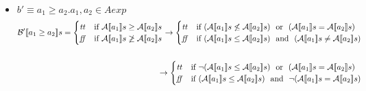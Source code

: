 {\begin{enumerate}[label=(\alph*)]
\begin{itemize}
\begin{align*}
\begin{cases}
        \end{cases}
        \rightarrow
        \begin{cases} 
        \semtrue & 
        \mbox{if} \ (\A{a_1} \leq \A{a_2}) \ \mbox{ and } \ (\A{a_1} \not =  \A{a_2})\\ 
        \semfalse & 
        \mbox{if} \ \lnot ((\A{a_1} \leq \A{a_2}) \ \mbox{ and } \ (\A{a_1} \not =  \A{a_2}))\\
        \end{cases} \\ \\
        \rightarrow
        \begin{cases} 
        \semtrue & 
        \mbox{if} \ (\A{a_1} \leq \A{a_2}) \ \mbox{ and } \ \lnot (\A{a_1} =  \A{a_2})\\ 
        \semfalse & 
        \mbox{if} \ \lnot ((\A{a_1} \leq \A{a_2}) \ \mbox{ and } \ \lnot (\A{a_1} = \A{a_2}))\\
        \end{cases}
      \end{align*} 
    \item $ b' \equiv a_1 \geq a_2. a_1, a_2 \in Aexp $ \\
    \begin{align*}
      \Bext{a_1 \geq a_2} = 
      \begin{cases} 
      \semtrue & 
      \mbox{if} \ \A{a_1} \geq \A{a_2}\\ 
      \semfalse & 
      \mbox{if} \ \A{a_1} \not \geq \A{a_2}\\
      \end{cases} 
      \rightarrow
      \begin{cases} 
      \semtrue & 
      \mbox{if} \ (\A{a_1} \not \leq \A{a_2})  \ \mbox{ or } \ (\A{a_1} = \A{a_2})\\ 
      \semfalse & 
      \mbox{if} \  (\A{a_1} \leq \A{a_2})  \ \mbox{ and } \ (\A{a_1} \not = \A{a_2})\\
      \end{cases} \\ \\
      \rightarrow
      \begin{cases} 
      \semtrue & 
      \mbox{if} \ \lnot (\A{a_1} \leq \A{a_2})  \ \mbox{ or } \ (\A{a_1} = \A{a_2})\\ 
      \semfalse & 
      \mbox{if} \  (\A{a_1} \leq \A{a_2})  \ \mbox{ and } \ \lnot (\A{a_1} = \A{a_2})\\
      \end{cases} \\ \\ 

\end{align*}
\end{itemize}
\end{enumerate}}
